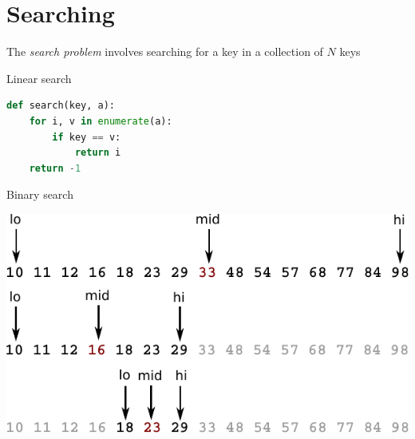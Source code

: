 \documentclass[8pt,a4paper,compress,handout]{beamer}
\begin{document}
\section{Searching}
\begin{frame}[fragile]
The \emph{search problem} involves searching for a key in a collection of $N$ keys

\bigskip

Linear search
\begin{lstlisting}[language=Python]
def search(key, a):
    for i, v in enumerate(a):
        if key == v:
            return i
    return -1
\end{lstlisting}

\bigskip

Binary search

\begin{minipage}{150pt}
\begin{center}
\includegraphics[scale=0.4]{./figures/bs1.pdf}

\smallskip


\end{center}
\end{minipage}
\end{frame}
\end{document}

